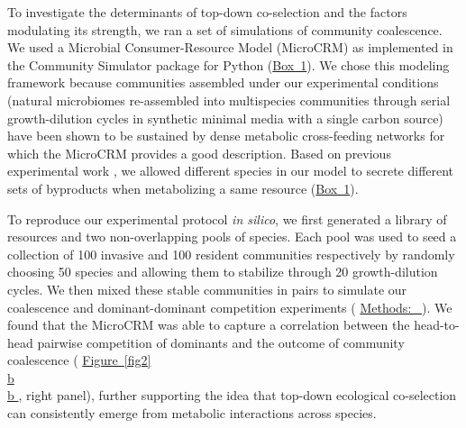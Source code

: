 \documentclass[a4paper,10pt]{article}
\newcommand{\figref}[2][]{%
  \hyperref[{#2}]{%
    Figure~\ref*{#2}%
    \ifx\\#1\\%
    \else
      #1%
    \fi
  }%
}
\newcommand{\methodsref}[1]{%
  \hyperref[{methods:#1}]{%
   Methods:~\nameref*{methods:#1}%
  }%
}
\begin{document}
To investigate the determinants of top-down co-selection and the factors modulating its strength,
we ran a set of simulations of community coalescence. We used a Microbial Consumer-Resource
Model (MicroCRM) \cite{Goldford2018,Marsland2019} as implemented in the Community Simulator package
for Python \cite{Marsland2020}
(\hyperref[box1]{Box~1}).
We chose this modeling framework because
communities assembled under our experimental conditions (natural microbiomes re-assembled into
multispecies communities through serial growth-dilution cycles in synthetic minimal media
with a single carbon source)
have been shown to be sustained by dense metabolic cross-feeding networks
\cite{Goldford2018,Estrela2020}
for which the MicroCRM provides a good description.
Based on previous experimental work
\cite{Harcombe2014,Pinu2018,Estrela2020},
we allowed different species in our model
to secrete different sets of byproducts when metabolizing a same resource
(\hyperref[box1]{Box~1}).

To reproduce our experimental protocol \textit{in silico},
we first generated a library of resources and two non-overlapping pools of species.
Each pool was used to seed a collection of 100 invasive
and 100 resident communities respectively
by randomly choosing 50 species and
allowing them to stabilize through 20 growth-dilution cycles.
We then mixed these stable communities in pairs to simulate our coalescence
and dominant-dominant competition experiments
(\methodsref{sim}).
We found that the MicroCRM was able to capture a correlation between
the head-to-head pairwise competition of dominants
and the outcome of community coalescence
(\figref[b]{fig2}, right panel),
further supporting the idea that top-down ecological co-selection can consistently
emerge from metabolic interactions across species.

\clearpage
\end{document}
